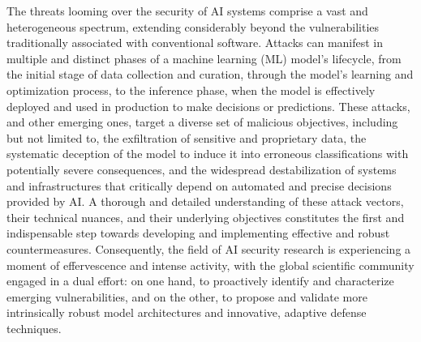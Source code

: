 \documentclass[twoside,brazilian,english]{UNISINOSmonografia}
\begin{document}
The threats looming over the security of AI systems comprise a vast and heterogeneous spectrum, extending considerably beyond the vulnerabilities traditionally associated with conventional software. Attacks can manifest in multiple and distinct phases of a machine learning (ML) model's lifecycle, from the initial stage of data collection and curation, through the model's learning and optimization process, to the inference phase, when the model is effectively deployed and used in production to make decisions or predictions. These attacks, and other emerging ones, target a diverse set of malicious objectives, including but not limited to, the exfiltration of sensitive and proprietary data, the systematic deception of the model to induce it into erroneous classifications with potentially severe consequences, and the widespread destabilization of systems and infrastructures that critically depend on automated and precise decisions provided by AI. A thorough and detailed understanding of these attack vectors, their technical nuances, and their underlying objectives constitutes the first and indispensable step towards developing and implementing effective and robust countermeasures. Consequently, the field of AI security research is experiencing a moment of effervescence and intense activity, with the global scientific community engaged in a dual effort: on one hand, to proactively identify and characterize emerging vulnerabilities, and on the other, to propose and validate more intrinsically robust model architectures and innovative, adaptive defense techniques.
\end{document}
